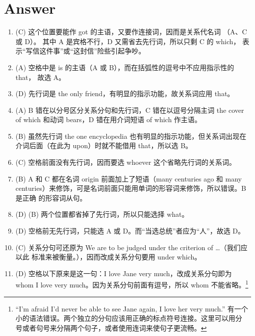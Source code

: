\section{Answer}
\begin{enumerate}
\item (C) 这个位置要能作 got 的主语，又要作连接词，因而是关系代名词
  （A、C 或 D）。 其中 A 是宾格不行，D 又需省去先行词，所以只剩 C 的 which，
  表示“写信这件事”或“这封信”险些引起争吵。


\item (A) 空格中是 is 的主语（A 或 B），而在括弧性的逗号中不应用指示性的 that，
  故选 A。

\item (D) 先行词是 the only friend，有明显的指示功能，故关系词应用 that。

\item (A) B 错在以分号区分关系分句和先行词，C 错在以逗号分隔主词 the cover of which 和动词 bears，D 错在用介词短语 of which 作主语。


\item  (B) 虽然先行词 the one encyclopedia 也有明显的指示功能，但关系词出现在介词后面（在此为 upon）时就不能借用 that，所以选 B。

\item (C) 空格前面没有先行词，因而要选 whoever 这个省略先行词的关系词。

\item (B) A 和 C 都在名词 origin 前面加上了短语（many centuries ago 和 many
  centuries）来修饰，可是名词前面只能用单词的形容词来修饰，所以错误。B 是正确
  的形容词从句。

\item {} (D)  (B) 两个位置都省掉了先行词，所以只能选择 what。
\item (D) 空格前无先行词，只能选 A 或 D。而“当选总统”者应为“人”，故选 D。


\item (C) 关系分句可还原为 We are to be judged under the criterion of \ldots（我们应以此
  标准来被衡量。），因而改成关系分句要用 under which。


\item (D) 空格以下原来是这一句：I love Jane very much，改成关系分句即为 whom I
  love very much。因为关系分句前面有逗号，所以 whom 不能省略。\footnote{
    “I'm afraid I'd never be able to see Jane again, I love her very much.”
    有一个小的语法错误。两个独立的分句应该用正确的标点符号连接。这里可以用分
    号或者句号来分隔两个句子，或者使用连词来使句子更流畅。

}
\end{enumerate}
